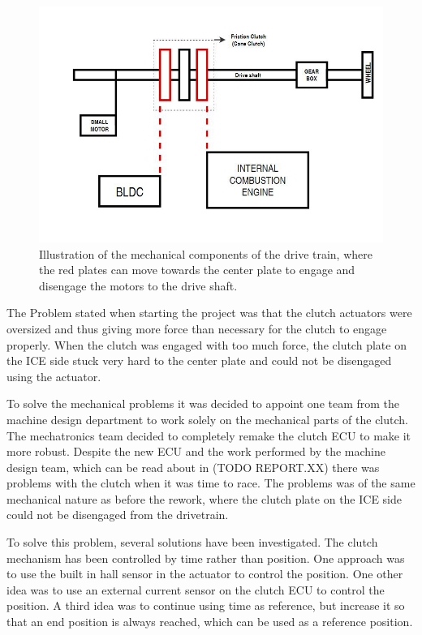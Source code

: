 \begin{figure}[H]
    \centering
    \label{fig:Drivetrain}
    \includegraphics[width=1\textwidth]{./img/Drivetrain}
    \caption{Illustration of the mechanical components of the drive train, where the red plates can move towards the center plate to engage and disengage the motors to the drive shaft.}
\end{figure}

The Problem stated when starting the project was that the clutch actuators were oversized and thus giving more force than necessary for the clutch to engage properly. When the clutch was engaged with too much force, the clutch plate on the ICE side stuck very hard to the center plate and could not be disengaged using the actuator.

To solve the mechanical problems it was decided to appoint one team from the machine design department to work solely on the mechanical parts of the clutch. The mechatronics team decided to completely remake the clutch ECU to make it more robust. Despite the new ECU and the work performed by the machine design team, which can be read about in (TODO REPORT.XX) there was problems with the clutch when it was time to race. The problems was of the same mechanical nature as before the rework, where the clutch plate on the ICE side could not be disengaged from the drivetrain.

To solve this problem, several solutions have been investigated. The clutch mechanism has been controlled by time rather than position. One approach was to use the built in hall sensor in the actuator to control the position. One other idea was to use an external current sensor on the clutch ECU to control the position. A third idea was to continue using time as reference, but increase it so that an end position is always reached, which can be used as a reference position.

